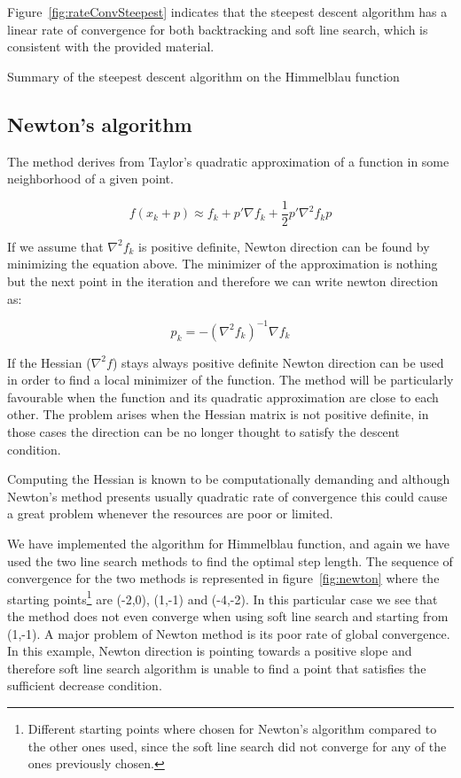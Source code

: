 Figure~\ref{fig:rateConvSteepest} indicates that the steepest descent algorithm has a linear rate of convergence for both backtracking and soft line search, which is consistent with the provided material.

\begin{table}[htb]
\centering

\caption{Summary of the steepest descent algorithm on the Himmelblau function}
\label{tab:steepest}
\end{table}


\subsection{Newton's algorithm}

The method derives from Taylor's quadratic approximation of a function in some neighborhood of a given point.

\begin{equation}
f (x_k + p) \approx f_k + p' \nabla f_k + \frac{1}{2}
p' \nabla^2 f_k p
\label{eq:taylor}
\end{equation}


If we assume that $\nabla^2 f_k$ is positive definite, Newton direction can be found by minimizing the equation above. The minimizer of the approximation is nothing but the next point in the iteration and therefore we can write newton direction as:

\begin{equation}
p_k = -(\nabla^2 f_k)^{-1} \nabla f_k
\label{eq:newtondir}
\end{equation}


If the Hessian ($\nabla^2 f$) stays always positive definite Newton direction can be used in order to find a local minimizer of the function. The method will be particularly favourable when the function and its quadratic approximation are close to each other.
The problem arises when the Hessian matrix is not positive definite, in those cases the direction can be no longer thought to satisfy the descent condition.

Computing the Hessian is known to be computationally demanding and although Newton’s method presents usually quadratic rate of convergence this could cause a great problem whenever the resources are poor or limited.

We have implemented the algorithm for Himmelblau function, and again we have used the two line search methods to find the optimal step length. The sequence of convergence for the two methods is represented in figure~\ref{fig:newton} where the starting points\footnote{Different starting points where chosen for Newton's algorithm compared to the other ones used, since the soft line search did not converge for any of the ones previously chosen.} are (-2,0), (1,-1) and (-4,-2). In this particular case we see that the method does not even converge when using soft line search and starting from (1,-1). A major problem of Newton method is its poor rate of global convergence. In this example, Newton direction is pointing towards a positive slope and therefore soft line search algorithm is unable to find a point that satisfies the sufficient decrease condition.

